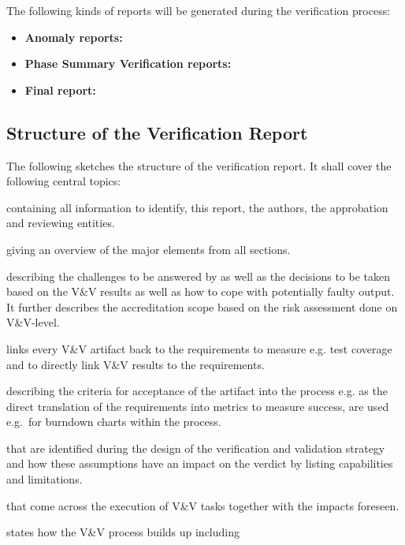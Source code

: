 The following kinds of reports will be generated during the verification process:
\begin{itemize}
\item \textbf{Anomaly reports:} 
\item \textbf{Phase Summary Verification reports:} 
\item \textbf{Final report:}
\end{itemize}

\subsection{Structure of the Verification Report}
\label{sec:struct-verif-report}

The following sketches the structure of the verification report. It
shall cover the following central topics:
\begin{description}\setlength{\parsep}{0pt}\setlength{\itemsep}{0pt}\setlength{\topsep}{0pt}
\item[Header] containing all information to identify, this report, the
  authors, the approbation and reviewing entities.
\item[Executive Summary] giving an overview of the major elements from
  all sections. 
\item[Problem Statement] describing the challenges to be answered by
  \VV as well as the decisions to be taken based on the V\&V results
  as well as how to cope with potentially faulty output. It further
  describes the accreditation scope based on the risk assessment done
  on V\&V-level. 
\item[V\&V Requirements Traceability Matrix] links every V\&V artifact
  back to the requirements to measure e.g. test coverage and to
  directly link V\&V results to the requirements. 
\item[Acceptability Criteria,] describing the criteria for acceptance
  of the artifact into the \VV process e.g. as the direct translation
  of the requirements into metrics to measure success, are used
  e.g.\ for burndown charts within the process. 
\item[Assumptions] that are identified during the design of the
  verification and validation strategy and how these assumptions have
  an impact on the verdict by listing capabilities and limitations. 
\item[Risks and Impacts] that come across the execution of V\&V tasks
  together with the impacts foreseen. 
\item[V\&V Design] states how the V\&V process builds up including

\end{description}

